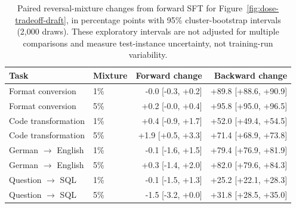 \begin{table}[t]\centering\small
\begin{tabular}{llrr}\toprule
Task & Mixture & Forward change & Backward change \\\midrule
Format conversion & 1\% & -0.0 [-0.3, +0.2] & +89.8 [+88.6, +90.9] \\
Format conversion & 5\% & +0.2 [-0.0, +0.4] & +95.8 [+95.0, +96.5] \\
Code transformation & 1\% & +0.4 [-0.9, +1.7] & +52.0 [+49.4, +54.5] \\
Code transformation & 5\% & +1.9 [+0.5, +3.3] & +71.4 [+68.9, +73.8] \\
German $\to$ English & 1\% & -0.1 [-1.6, +1.5] & +79.4 [+76.9, +81.9] \\
German $\to$ English & 5\% & +0.3 [-1.4, +2.0] & +82.0 [+79.6, +84.3] \\
Question $\to$ SQL & 1\% & -0.1 [-1.5, +1.3] & +25.2 [+22.1, +28.3] \\
Question $\to$ SQL & 5\% & -1.5 [-3.2, +0.0] & +31.8 [+28.5, +35.0] \\
\bottomrule\end{tabular}
\caption{Paired reversal-mixture changes from forward SFT for Figure~\ref{fig:dose-tradeoff-draft}, in percentage points with 95\% cluster-bootstrap intervals (2,000 draws). These exploratory intervals are not adjusted for multiple comparisons and measure test-instance uncertainty, not training-run variability.}\label{tab:preservation-paired}\end{table}
